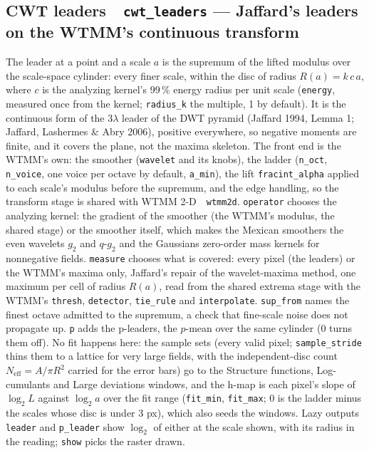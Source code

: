 \documentclass[10pt]{article}
\newcommand{\dev}[1]{\texttt{#1}}
\newcommand{\tool}[2]{#1~\textperiodcentered~\dev{#2}}
\begin{document}
\subsection{\tool{CWT leaders}{cwt\_leaders} --- Jaffard's leaders on the WTMM's continuous transform}

The leader at a point and a scale $a$ is the supremum of the lifted modulus over the scale-space
cylinder: every finer scale, within the disc of radius $R(a) = k\,c\,a$, where $c$ is the analyzing
kernel's 99\,\% energy radius per unit scale (\texttt{energy}, measured once from the kernel;
\texttt{radius\_k} the multiple, 1 by default). It is the continuous form of the $3\lambda$ leader
of the DWT pyramid (Jaffard 1994, Lemma 1; Jaffard, Lashermes \& Abry 2006), positive everywhere, so
negative moments are finite, and it covers the plane, not the maxima skeleton. The front end is the
WTMM's own: the smoother (\texttt{wavelet} and its knobs), the ladder (\texttt{n\_oct},
\texttt{n\_voice}, one voice per octave by default, \texttt{a\_min}), the lift
\texttt{fracint\_alpha} applied to each scale's modulus before the supremum, and the edge handling,
so the transform stage is shared with \tool{WTMM 2-D}{wtmm2d}. \texttt{operator} chooses the
analyzing kernel: the gradient of the smoother (the WTMM's modulus, the shared stage) or the
smoother itself, which makes the Mexican smoothers the even wavelets $g_2$ and $q$-$g_2$ and the
Gaussians zero-order mass kernels for nonnegative fields. \texttt{measure} chooses what is
covered: every pixel (the leaders) or the WTMM's maxima only, Jaffard's repair of the
wavelet-maxima method, one maximum per cell of radius $R(a)$, read from the shared extrema stage
with the WTMM's \texttt{thresh}, \texttt{detector}, \texttt{tie\_rule} and \texttt{interpolate}.
\texttt{sup\_from} names the finest octave admitted to the supremum, a check that fine-scale noise
does not propagate up. \texttt{p} adds the p-leaders, the $p$-mean over the same cylinder (0 turns
them off). No fit happens here: the sample sets (every valid pixel; \texttt{sample\_stride} thins
them to a lattice for very large fields, with the independent-disc count $N_{\mathrm{eff}} =
A/\pi R^2$ carried for the error bars) go to the Structure functions, Log-cumulants and Large
deviations windows, and the h-map is each pixel's slope of $\log_2 L$ against $\log_2 a$ over the
fit range (\texttt{fit\_min}, \texttt{fit\_max}; 0 is the ladder minus the scales whose disc is
under 3 px), which also seeds the windows. Lazy outputs \texttt{leader} and \texttt{p\_leader}
show $\log_2$ of either at the scale shown, with its radius in the reading; \texttt{show} picks
the raster drawn.
\end{document}
